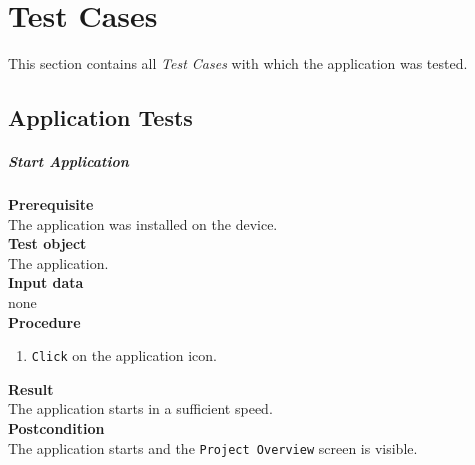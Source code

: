 \chapter{Test Cases}
\label{app:testcases}

This section contains all \textit{Test Cases} with which the application was tested.

\section{Application Tests}

\paragraph*{\textbf{Start Application}}
\textbf{Prerequisite}\\
The application was installed on the device.\\
\textbf{Test object}\\
The application.\\
\textbf{Input data}\\
none\\
\textbf{Procedure}
\begin{enumerate}
	\item \texttt{Click} on the application icon.
\end{enumerate}
\textbf{Result}\\
The application starts in a sufficient speed.\\
\textbf{Postcondition}\\
The application starts and the \texttt{Project Overview} screen is visible.

